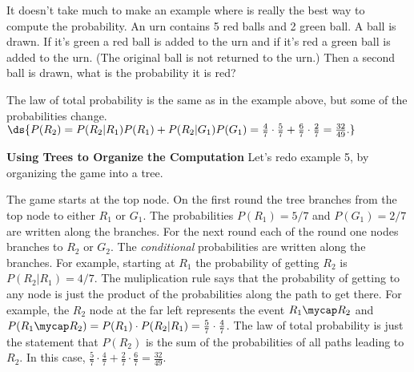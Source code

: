 It doesn't take much to make an example where  is really the
best way to compute the probability.
 An urn contains 5 red balls and 2 green ball. A
ball is drawn. If it's green a red ball is added to the urn and if it's
red a green ball is added to the urn. (The original ball is not returned
to the urn.) Then a second ball is drawn,
what is the probability it is red?

\ans The law of total probability is the same as in the example above,
but some of the probabilities change.
$\ds{P(R_2) = P(R_2|R_1)P(R_1) + P(R_2|G_1)P(G_1) = 
\frac47\cdot\frac57 + \frac67\cdot\frac27 = \frac{32}{49}.}$

\bigskip

\textbf{Using Trees to Organize the Computation}
Let's redo example 5, by organizing the game into a tree.

The game starts at the top node. 
On the first round the tree branches
from the top node to either $R_1$ or $G_1$. The probabilities 
$P(R_1) = 5/7$ and $P(G_1) = 2/7$ are written along the branches.
For the next round each of the round one nodes branches to $R_2$ or $G_2$.
The \emph{conditional} probabilities are written along the branches.
For example, starting at $R_1$ the probability of getting $R_2$ is
$P(R_2|R_1) = 4/7.$
The muliplication rule says that the probability of getting to any node
is just the product of the probabilities along the path to get there.
For example, the $R_2$ node at the far left represents the event
$R_1\mycap R_2$ and $P(R_1\mycap R_2) = P(R_1)\cdot P(R_2|R_1) = 
\frac57\cdot\frac47$.
The law of total probability is just the statement that 
$P(R_2)$ is the sum of the probabilities of all paths leading to $R_2$.
In this case, $\frac57\cdot\frac47 + \frac27\cdot\frac67 = \frac{32}{49}.$

